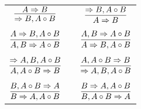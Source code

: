 \documentclass[11pt]{article}
\begin{document}
\begin{center}
\begin{tabular}{ccc}
$\infer{\Rightarrow B, A\circ B}{A\Rightarrow B}$ && $\infer{A\Rightarrow B}{\Rightarrow B, A\circ B}$ \\
&& \\
$\infer{A, B\Rightarrow A\circ B}{A\Rightarrow B, A\circ B}$ && $\infer{A\Rightarrow B, A\circ B}{A, B\Rightarrow A\circ B}$ \\
&& \\
$\infer{A, A\circ B\Rightarrow B}{\Rightarrow A, B, A\circ B}$ && $\infer{\Rightarrow A, B, A\circ B}{A, A\circ B\Rightarrow B}$ \\
&& \\
$\infer{B\Rightarrow A, A\circ B}{B, A\circ B\Rightarrow A}$ && $\infer{B, A\circ B\Rightarrow A}{B\Rightarrow A, A\circ B}$ \\
\end{tabular}


\end{center}
\end{document}
